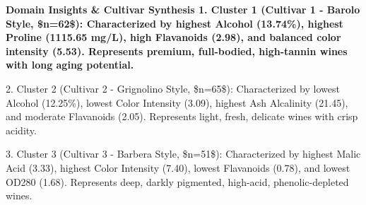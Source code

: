 \vspace{0.3em}
\begin{tcolorbox}[colback=gray!5!white,colframe=gray!50!black,boxrule=0.5pt,arc=2pt,left=4pt,right=4pt,top=2pt,bottom=2pt,unbreakable,before upper={\sloppy\raggedright}]
{\small\bfseries Domain Insights \& Cultivar Synthesis
1. Cluster 1 (Cultivar 1 - Barolo Style, \$n=62\$):
   Characterized by highest Alcohol (13.74\%), highest Proline (1115.65 mg/L), high Flavanoids (2.98), and balanced color intensity (5.53). Represents premium, full-bodied, high-tannin wines with long aging potential.

2. Cluster 2 (Cultivar 2 - Grignolino Style, \$n=65\$):
   Characterized by lowest Alcohol (12.25\%), lowest Color Intensity (3.09), highest Ash Alcalinity (21.45), and moderate Flavanoids (2.05). Represents light, fresh, delicate wines with crisp acidity.

3. Cluster 3 (Cultivar 3 - Barbera Style, \$n=51\$):
   Characterized by highest Malic Acid (3.33), highest Color Intensity (7.40), lowest Flavanoids (0.78), and lowest OD280 (1.68). Represents deep, darkly pigmented, high-acid, phenolic-depleted wines.\par}
\end{tcolorbox}
